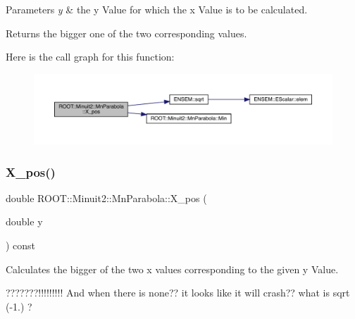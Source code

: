 \begin{DoxyParams}{Parameters}
{\em y} & the y Value for which the x Value is to be calculated.\\
\hline
\end{DoxyParams}
\begin{DoxyReturn}{Returns}
the bigger one of the two corresponding values. 
\end{DoxyReturn}
Here is the call graph for this function\+:
\nopagebreak
\begin{figure}[H]
\begin{center}
\leavevmode
\includegraphics[width=350pt]{db/d7d/classROOT_1_1Minuit2_1_1MnParabola_a2b4623df00488ca3d4175eb92123066e_cgraph}
\end{center}
\end{figure}
\mbox{\label{classROOT_1_1Minuit2_1_1MnParabola_a2b4623df00488ca3d4175eb92123066e}} 
\subsubsection{\texorpdfstring{X\_pos()}{X\_pos()}\hspace{0.1cm}{\footnotesize\ttfamily [2/3]}}
{\footnotesize\ttfamily double R\+O\+O\+T\+::\+Minuit2\+::\+Mn\+Parabola\+::\+X\+\_\+pos (\begin{DoxyParamCaption}\item[{double}]{y }\end{DoxyParamCaption}) const\hspace{0.3cm}{\ttfamily [inline]}}

Calculates the bigger of the two x values corresponding to the given y Value.

???????!!!!!!!!! And when there is none?? it looks like it will crash?? what is sqrt (-\/1.) ?


